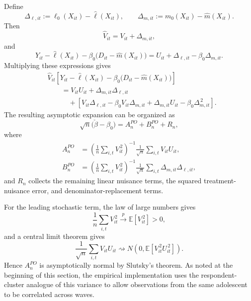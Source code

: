 \documentclass[11pt,oneside,a4paper]{book}
\begin{document}
Define
\begin{equation*}
\Delta_{\ell,it}
:=
\ell_0(X_{it})-\widehat{\ell}(X_{it}),
\qquad
\Delta_{m,it}
:=
m_0(X_{it})-\widehat{m}(X_{it}).
\end{equation*}
Then
\begin{equation*}
\widehat{V}_{it}
=
V_{it}+\Delta_{m,it},
\end{equation*}
and
\begin{equation*}
Y_{it}-\widehat{\ell}(X_{it})
-\beta_0\bigl(D_{it}-\widehat{m}(X_{it})\bigr)
=
U_{it}+\Delta_{\ell,it}-\beta_0\Delta_{m,it}.
\end{equation*}
Multiplying these expressions gives
\begin{align*}
&\widehat{V}_{it}
\left[
Y_{it}-\widehat{\ell}(X_{it})
-\beta_0\bigl(D_{it}-\widehat{m}(X_{it})\bigr)
\right] \\
&\qquad =
V_{it}U_{it}
+\Delta_{m,it}\Delta_{\ell,it} \\
&\qquad\quad+
\left[
V_{it}\Delta_{\ell,it}
-\beta_0V_{it}\Delta_{m,it}
+\Delta_{m,it}U_{it}
-\beta_0\Delta_{m,it}^{\,2}
\right].
\end{align*}
The resulting asymptotic expansion can be organized as
\begin{equation*}
\sqrt{n}\bigl(\check{\beta}-\beta_0\bigr)
=
A_n^{PO}+B_n^{PO}+R_n,
\end{equation*}
where
\begin{align*}
A_n^{PO}
&=
\left(
\frac{1}{n}\sum_{i,t}V_{it}^{\,2}
\right)^{-1}
\frac{1}{\sqrt{n}}\sum_{i,t}V_{it}U_{it}, \\
B_n^{PO}
&=
\left(
\frac{1}{n}\sum_{i,t}V_{it}^{\,2}
\right)^{-1}
\frac{1}{\sqrt{n}}\sum_{i,t}
\Delta_{m,it}\Delta_{\ell,it},
\end{align*}
and \(R_n\) collects the remaining linear nuisance terms, the squared treatment-nuisance error, and denominator-replacement terms.

For the leading stochastic term, the law of large numbers gives
\begin{equation*}
\frac{1}{n}\sum_{i,t}V_{it}^{\,2}
\overset{p}{\longrightarrow}
\mathbb{E}[V_{it}^{\,2}]>0,
\end{equation*}
and a central limit theorem gives
\begin{equation*}
\frac{1}{\sqrt{n}}\sum_{i,t}V_{it}U_{it}
\rightsquigarrow
N\!\left(
0,
\mathbb{E}\!\left[V_{it}^{\,2}U_{it}^{\,2}\right]
\right).
\end{equation*}
Hence \(A_n^{PO}\) is asymptotically normal by Slutsky's theorem. As noted at the beginning of this section, the empirical implementation uses the respondent-cluster analogue of this variance to allow observations from the same adolescent to be correlated across waves.
\end{document}
